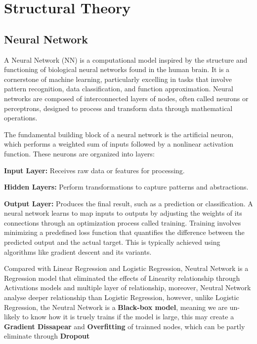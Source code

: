 \section{Structural Theory }

\subsection{Neural Network}

    A Neural Network (NN) is a computational model inspired by the structure and functioning of biological neural networks found in the human brain. It is a cornerstone of machine learning, particularly excelling in tasks that involve pattern recognition, data classification, and function approximation. Neural networks are composed of interconnected layers of nodes, often called neurons or perceptrons, designed to process and transform data through mathematical operations.

The fundamental building block of a neural network is the artificial neuron, which performs a weighted sum of inputs followed by a nonlinear activation function. These neurons are organized into layers:

\textbf{Input Layer:} Receives raw data or features for processing.

\textbf{Hidden Layers:} Perform transformations to capture patterns and abstractions.

\textbf{Output Layer:} Produces the final result, such as a prediction or classification.
A neural network learns to map inputs to outputs by adjusting the weights of its connections through an optimization process called training. Training involves minimizing a predefined loss function that quantifies the difference between the predicted output and the actual target. This is typically achieved using algorithms like gradient descent and its variants.

Compared with Linear Regression and Logistic Regression, Neutral Network is a Regression model that eliminated the effects of Linearity relationship through Activations models and multiple layer of relationship, moreover, Neutral Network analyse deeper relationship than Logistic Regression, however, unlike Logistic Regression, the Neutral Network is a \textbf{Black-box model}, meaning we are un-likely to know how it is truely trains if the model is large, this may create a \textbf{Gradient Dissapear} and \textbf{Overfitting} of trainned nodes, which can be partly eliminate through \textbf{Dropout}

